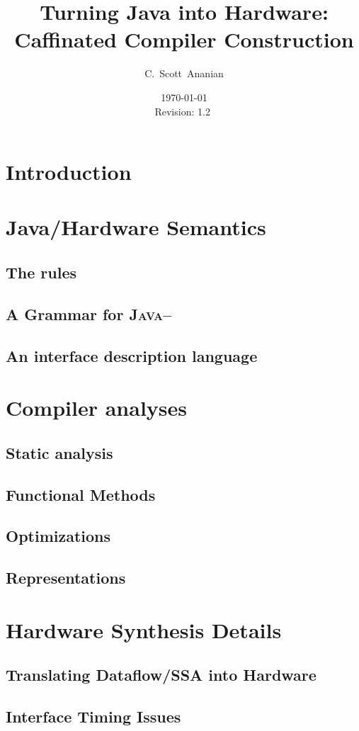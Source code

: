 \documentclass[10pt,notitlepage]{article}
\author{C.~Scott~Ananian}
\title{Turning Java into Hardware: \\ Caffinated Compiler Construction}
\date{\today \\ $ $Revision: 1.2 $ $}
\begin{document}

\maketitle

\section{Introduction}
\section{Java/Hardware Semantics}
\subsection{The rules}
\subsection{A Grammar for \textsc{Java--}}
\subsection{An interface description language}
\section{Compiler analyses}
\subsection{Static analysis} %
\subsection{Functional Methods}
\subsection{Optimizations}
\subsection{Representations}
\section{Hardware Synthesis Details}
\subsection{Translating Dataflow/SSA into Hardware}
\subsection{Interface Timing Issues}
\end{document}
